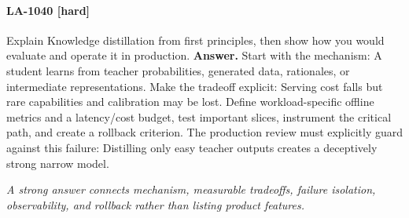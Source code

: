 \paragraph{LA-1040 [hard]} Explain Knowledge distillation from first principles, then show how you would evaluate and operate it in production.
\noindent\textbf{Answer.} Start with the mechanism: A student learns from teacher probabilities, generated data, rationales, or intermediate representations. Make the tradeoff explicit: Serving cost falls but rare capabilities and calibration may be lost. Define workload-specific offline metrics and a latency/cost budget, test important slices, instrument the critical path, and create a rollback criterion. The production review must explicitly guard against this failure: Distilling only easy teacher outputs creates a deceptively strong narrow model.
\par\textit{A strong answer connects mechanism, measurable tradeoffs, failure isolation, observability, and rollback rather than listing product features.}
